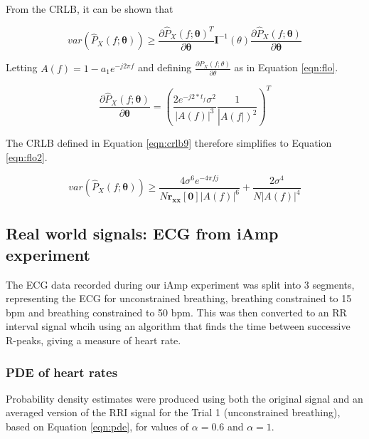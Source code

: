From the CRLB, it can be shown that 

\begin{equation}
\textit{var}\left(\hat{P}_{X}(f ; \boldsymbol{\theta})\right) \geq \frac{\partial \hat{P}_{X}(f ; \boldsymbol{\theta})^{T}}{\partial \boldsymbol{\theta}} \boldsymbol{I}^{-1}(\theta) \frac{\partial \hat{P}_{X}(f ; \boldsymbol{\theta})}{\partial \boldsymbol{\theta}}
\label{eqn:crlb9}
\end{equation}

\noindent
Letting $A(f)=1-a_{1} e^{-j 2 \pi f}$ and defining $\frac{\partial P_{X}(f ; \theta)}{\partial \theta}$ as in Equation \ref{eqn:flo}.

\begin{equation}
\frac{\partial \hat{P}_{X}(f ; \boldsymbol{\theta})}{\partial \boldsymbol{\theta}}=\left(\frac{2 e^{-j 2 * t_{f}} \sigma^{2}}{|A(f)|^{3}} \frac{1}{\left|A(f |)^{2}\right.}\right)^{T}
\label{eqn:flo}
\end{equation}

\noindent
The CRLB defined in Equation \ref{eqn:crlb9} therefore simplifies to Equation \ref{eqn:flo2}.

\begin{equation}
\textit{var}\left(\hat{P}_{X}(f ; \boldsymbol{\theta})\right) \geq \frac{4 \sigma^{6} e^{-4 \pi f j}}{N \boldsymbol{r}_{\boldsymbol{x} \boldsymbol{x}}[\mathbf{0}]|A(f)|^{6}}+\frac{2 \sigma^{4}}{N|A(f)|^{4}}
\label{eqn:flo2}
\end{equation}

\subsection{{Real world signals: ECG from iAmp experiment}}

The ECG data recorded during our iAmp experiment was split into 3 segments, representing the ECG for unconstrained breathing, breathing constrained to 15 bpm and breathing constrained to 50 bpm. This was then converted to an RR interval signal whcih using an algorithm that finds the time between successive R-peaks, giving a measure of heart rate.

\subsubsection{PDE of heart rates}

Probability density estimates were produced using both the original signal and an averaged version of the RRI signal for the Trial 1 (unconstrained breathing), based on Equation \ref{eqn:pde}, for values of $\alpha = 0.6$ and $\alpha = 1$. 

